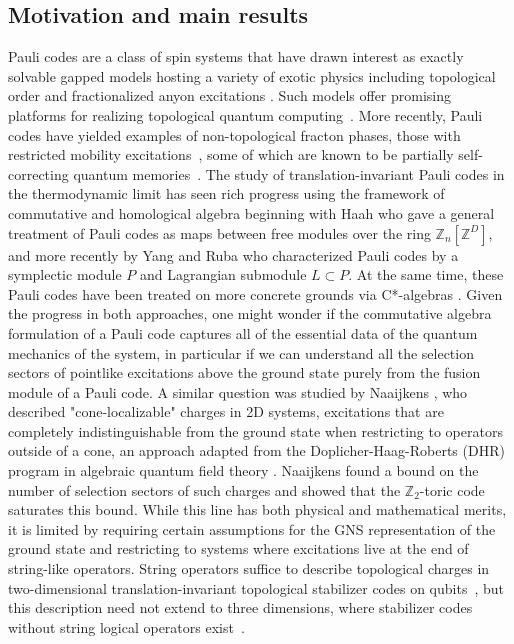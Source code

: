 \documentclass[11pt]{amsart}
\begin{document}
\subsection{Motivation and main results}
Pauli codes are a class of spin systems that have drawn interest as exactly solvable gapped models hosting a variety of exotic physics including topological order and fractionalized anyon excitations \cite{kitaev_2003}. Such models offer promising platforms for realizing topological quantum computing~\cite{kitaev_2003,fowler_2012}. More recently, Pauli codes have yielded examples of non-topological fracton phases, those with restricted mobility excitations~\cite{chamon_2005,haah_2011,vijay_haah_fu_2016}, some of which are known to be partially self-correcting quantum memories~\cite{bravyi_haah_2013}. The study of translation-invariant Pauli codes in the thermodynamic limit has seen rich progress using the framework of commutative and homological algebra beginning with Haah \cite{haah_2013} who gave a general treatment of Pauli codes as maps between free modules over the ring $\mathbb{Z}_n[\mathbb{Z}^D]$, and more recently by Yang and Ruba \cite{ruba_yang_2024} who characterized Pauli codes by a symplectic module $P$ and Lagrangian submodule $L\subset P$. At the same time, these Pauli codes have been treated on more concrete grounds via C*-algebras \cite{cheng_higson_polo_ojito_prodan_2026}. Given the progress in both approaches, one might wonder if the commutative algebra formulation of a Pauli code captures all of the essential data of the quantum mechanics of the system, in particular if we can understand all the selection sectors of pointlike excitations above the ground state purely from the fusion module of a Pauli code. A similar question was studied by Naaijkens \cite{naaijkens_2011,naaijkens_2013,naaijkens_2017}, who described "cone-localizable" charges in 2D systems, excitations that are completely indistinguishable from the ground state when restricting to operators outside of a cone, an approach adapted from the Doplicher-Haag-Roberts (DHR) program in algebraic quantum field theory \cite{doplicher_haag_roberts_1971,doplicher_haag_roberts_1974}. Naaijkens found a bound on the number of selection sectors of such charges and showed that the $\mathbb Z_2$-toric code~\cite{kitaev_2003} saturates this bound. While this line has both physical and mathematical merits, it is limited by requiring certain assumptions for the GNS representation of the ground state and restricting to systems where excitations live at the end of string-like operators. String operators suffice to describe topological charges in two-dimensional translation-invariant topological stabilizer codes on qubits~\cite{bombin_2014}, but this description need not extend to three dimensions, where stabilizer codes without string logical operators exist~\cite{haah_2011}.   
\end{document}
